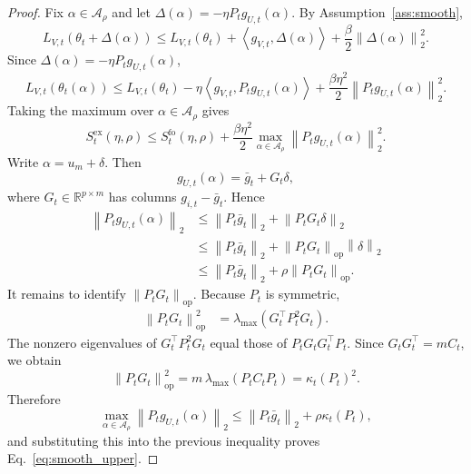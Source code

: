 \documentclass{article}
\newcommand{\RR}{\mathbb{R}}
\newcommand{\norm}[1]{\left\lVert #1 \right\rVert}
\newcommand{\inner}[2]{\left\langle #1, #2 \right\rangle}
\begin{document}
\begin{proof}
Fix $\alpha \in \mathcal{A}_{\rho}$ and let $\Delta(\alpha) = -\eta P_t g_{U,t}(\alpha)$. By Assumption~\ref{ass:smooth},
\begin{equation}
    L_{V,t}(\theta_t + \Delta(\alpha))
    \le
    L_{V,t}(\theta_t)
    +
    \inner{g_{V,t}}{\Delta(\alpha)}
    +
    \frac{\beta}{2}\norm{\Delta(\alpha)}_2^2.
\end{equation}
Since $\Delta(\alpha) = -\eta P_t g_{U,t}(\alpha)$,
\begin{equation}
    L_{V,t}(\theta_t(\alpha))
    \le
    L_{V,t}(\theta_t)
    -
    \eta \inner{g_{V,t}}{P_t g_{U,t}(\alpha)}
    +
    \frac{\beta \eta^2}{2}\norm{P_t g_{U,t}(\alpha)}_2^2.
\end{equation}
Taking the maximum over $\alpha \in \mathcal{A}_{\rho}$ gives
\begin{equation}
    S_t^{\mathrm{ex}}(\eta,\rho)
    \le
    S_t^{\mathrm{fo}}(\eta,\rho)
    +
    \frac{\beta \eta^2}{2}
    \max_{\alpha \in \mathcal{A}_{\rho}}\norm{P_t g_{U,t}(\alpha)}_2^2.
\end{equation}
Write $\alpha = u_m + \delta$. Then
\begin{equation}
    g_{U,t}(\alpha)
    =
    \bar g_t + G_t \delta,
\end{equation}
where $G_t \in \RR^{p \times m}$ has columns $g_{i,t}-\bar g_t$. Hence
\begin{align}
    \norm{P_t g_{U,t}(\alpha)}_2
    &\le
    \norm{P_t \bar g_t}_2 + \norm{P_t G_t \delta}_2 \\
    &\le
    \norm{P_t \bar g_t}_2 + \norm{P_t G_t}_{\mathrm{op}}\norm{\delta}_2 \\
    &\le
    \norm{P_t \bar g_t}_2 + \rho \norm{P_t G_t}_{\mathrm{op}}.
\end{align}
It remains to identify $\norm{P_t G_t}_{\mathrm{op}}$. Because $P_t$ is symmetric,
\begin{align}
    \norm{P_t G_t}_{\mathrm{op}}^2
    &=
    \lambda_{\max}(G_t^\top P_t^2 G_t).
\end{align}
The nonzero eigenvalues of $G_t^\top P_t^2 G_t$ equal those of $P_t G_t G_t^\top P_t$. Since $G_t G_t^\top = m C_t$, we obtain
\begin{equation}
    \norm{P_t G_t}_{\mathrm{op}}^2
    =
    m\, \lambda_{\max}(P_t C_t P_t)
    =
    \kappa_t(P_t)^2.
\end{equation}
Therefore
\begin{equation}
    \max_{\alpha \in \mathcal{A}_{\rho}}\norm{P_t g_{U,t}(\alpha)}_2
    \le
    \norm{P_t \bar g_t}_2 + \rho \kappa_t(P_t),
\end{equation}
and substituting this into the previous inequality proves Eq.~\eqref{eq:smooth_upper}.
\end{proof}
\end{document}
